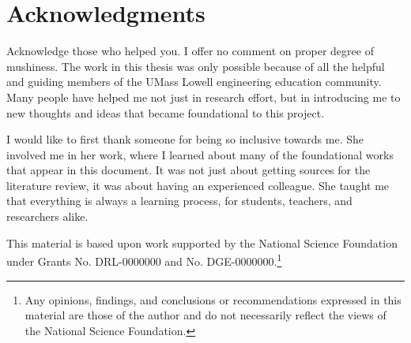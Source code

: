 \chapter*{Acknowledgments}
\renewcommand{\thefootnote}{\fnsymbol{footnote}}

Acknowledge those who helped you. I offer no comment on proper degree of mushiness. The work in this thesis was only possible because of all the helpful and guiding members of the UMass Lowell engineering education community. Many people have helped me not just in research effort, but in introducing me to new thoughts and ideas that became foundational to this project.

I would like to first thank someone for being so inclusive towards me. She involved me in her work, where I learned about many of the foundational works that appear in this document. It was not just about getting sources for the literature review, it was about having an experienced colleague.  She taught me that everything is always a learning process, for students, teachers, and researchers alike.

This material is based upon work supported by the National Science Foundation under Grants No. DRL-0000000 and No. DGE-0000000.\footnote{Any opinions, findings, and conclusions or recommendations expressed in this material are those of the author and do not necessarily reflect the views of the National Science Foundation.}